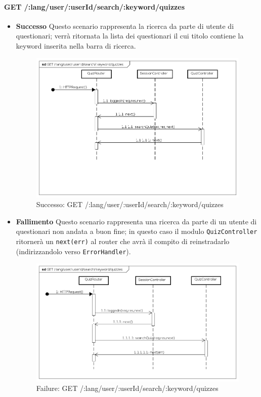 \paragraph{GET /:lang/user/:userId/search/:keyword/quizzes}
\begin{itemize}
\item \textbf{Successo}
Questo scenario rappresenta la ricerca da parte di utente di questionari; verrà ritornata la lista dei questionari il cui titolo contiene la keyword inserita nella barra di ricerca.

\begin{figure}[ht]
	\centering
	\includegraphics[scale=0.45]{UML/DiagrammiDiSequenza/Back-end/GET__lang_user__userId_search__keyword_quizzes_success.png}
	\caption{Successo: GET /:lang/user/:userId/search/:keyword/quizzes}
\end{figure}
\FloatBarrier

\item \textbf{Fallimento}
Questo scenario rappresenta una ricerca da parte di un utente di questionari non andata a buon fine; in questo caso il modulo \texttt{QuizController} ritornerà un \texttt{next(err)} al router che avrà il compito di reinstradarlo (indirizzandolo verso \texttt{ErrorHandler}).

\begin{figure}[ht]
	\centering
	\includegraphics[scale=0.45]{UML/DiagrammiDiSequenza/Back-end/GET__lang_user__userId_search__keyword_quizzes_failure.png}
	\caption{Failure: GET /:lang/user/:userId/search/:keyword/quizzes}
\end{figure}
\FloatBarrier
\end{itemize}
